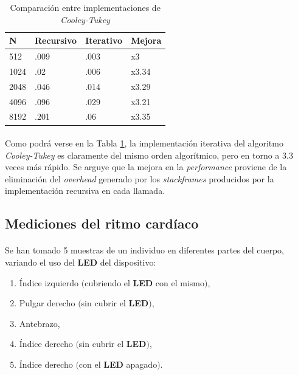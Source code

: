 \documentclass[12pt, twocolumn]{article}
\begin{document}
	\begin{table}[H]
		\centering
		\begin{tabular}{@{}llll@{}}
			\toprule
			N    & Recursivo & Iterativo & Mejora \\ \midrule
			512  & .009      & .003      & x3     \\
			1024 & .02       & .006      & x3.34  \\
			2048 & .046      & .014      & x3.29  \\
			4096 & .096      & .029      & x3.21  \\
			8192 & .201      & .06       & x3.35  \\ \bottomrule
		\end{tabular}
		\caption{Comparación entre implementaciones de \textit{Cooley-Tukey}}
		\label{fftcmp}
	\end{table}
	
	\paragraph{} Como podrá verse en la Tabla \ref{fftcmp}, la implementación iterativa del algoritmo \textit{Cooley-Tukey} es claramente del mismo orden algorítmico, pero en torno a $3.3$ veces más rápido. Se arguye que la mejora en la \textit{performance} proviene de la eliminación del \textit{overhead} generado por los \textit{stackframes} producidos por la implementación recursiva en cada llamada.
	
	
	\subsection{Mediciones del ritmo cardíaco}
	
	\paragraph{} Se han tomado 5 muestras de un individuo en diferentes partes del cuerpo, variando el uso del \textbf{LED} del dispositivo:
	
	\begin{enumerate}
		\item Índice izquierdo $($cubriendo el \textbf{LED} con el mismo$)$,
		\item Pulgar derecho $($sin cubrir el \textbf{LED}$)$,
		\item Antebrazo,
		\item Índice derecho $($sin cubrir el \textbf{LED}$)$,
		\item Índice derecho $($con el \textbf{LED} apagado$)$.
	\end{enumerate}
	
\end{document}
